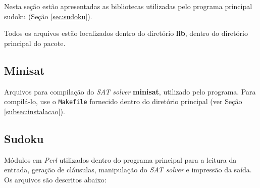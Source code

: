 \documentclass[a4paper]{article}
\begin{document}
  Nesta seção estão apresentadas as bibliotecas utilizadas pelo programa
  principal sudoku (Seção \ref{sec:sudoku}).
  
  Todos os arquivos estão localizados dentro do diretório \textbf{lib}, 
  dentro do diretório principal do pacote.
  
  \subsection{Minisat}
  \label{subsec:minisat}
  
    Arquivos para compilação do \emph{SAT solver} \textbf{minisat}, utilizado
    pelo programa. Para compilá-lo, use o \texttt{Makefile} fornecido dentro
    do diretório principal (ver Seção \ref{subsec:instalacao}).
  
  \subsection{Sudoku}
  \label{subsec:Sudoku}
  
    Módulos em \emph{Perl} utilizados dentro do programa principal para a
    leitura da entrada, geração de cláusulas, manipulação do \emph{SAT 
    solver} e impressão da saída. Os arquivos são descritos abaixo:
    
\end{document}

